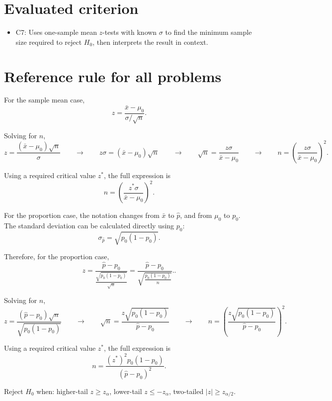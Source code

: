 \maketitle
\tableofcontents

\section*{Evaluated criterion}
\begin{itemize}
\item C7: Uses one-sample mean \(z\)-tests with known \(\sigma\) to find the minimum sample size required to reject \(H_0\), then interprets the result in context.
\end{itemize}

\section{Reference rule for all problems}

For the sample mean case,
\[
z=\frac{\bar x-\mu_0}{\sigma/\sqrt{n}}.
\]

Solving for \(n\),
\[
z=\frac{(\bar x-\mu_0)\sqrt{n}}{\sigma}
\qquad \longrightarrow \qquad
z\sigma=(\bar x-\mu_0)\sqrt{n}
\qquad \longrightarrow \qquad
\sqrt{n}=\frac{z\sigma}{\bar x-\mu_0}
\qquad \longrightarrow \qquad
n=\left(\frac{z\sigma}{\bar x-\mu_0}\right)^2.
\]

Using a required critical value \(z^*\), the full expression is
\[
n=\left(\frac{z^*\sigma}{\bar x-\mu_0}\right)^2.
\]

For the proportion case, the notation changes from \(\bar x\) to \(\hat p\), and from \(\mu_0\) to \(p_0\). The standard deviation can be calculated directly using \(p_0\):
\[
\sigma_{\hat p}=\sqrt{p_0(1-p_0)}.
\]

Therefore, for the proportion case,
\[
z=\frac{\hat p-p_0}{\frac{\sqrt{p_0(1-p_0)}}{\sqrt{n}}} = \frac{\hat p-p_0}{\sqrt{\frac{p_0(1-p_0)}{n}}}..
\]

Solving for \(n\),
\[
z=\frac{(\hat p-p_0)\sqrt{n}}{\sqrt{p_0(1-p_0)}}
\qquad \longrightarrow \qquad
\sqrt{n}=\frac{z\sqrt{p_0(1-p_0)}}{\hat p-p_0}
\qquad \longrightarrow \qquad
n=\left(\frac{z\sqrt{p_0(1-p_0)}}{\hat p-p_0}\right)^2.
\]

Using a required critical value \(z^*\), the full expression is
\[
n=\frac{(z^*)^2p_0(1-p_0)}{(\hat p-p_0)^2}.
\]

Reject \(H_0\) when: higher-tail \(z\ge z_\alpha\), lower-tail \(z\le -z_\alpha\), two-tailed \(|z|\ge z_{\alpha/2}\).

